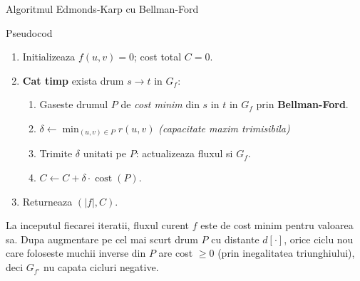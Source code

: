 ﻿\documentclass[9pt]{beamer}
\newcommand{\cost}{\operatorname{cost}}
\begin{document}
\begin{frame}[shrink]{Algoritmul Edmonds-Karp cu Bellman-Ford}
  \begin{block}{Pseudocod}
    \begin{enumerate}
      \item Initializeaza $f(u,v)=0$; cost total $C=0$.
      \item \textbf{Cat timp} exista drum $s\to t$ in $G_f$:
        \begin{enumerate}
          \item Gaseste drumul $P$ de \textit{cost minim} din $s$ in $t$ in $G_f$
                prin \textbf{Bellman-Ford}.
          \item $\delta\leftarrow\min_{(u,v)\in P} r(u,v)$ \quad \textit{(capacitate maxim trimisibila)}
          \item Trimite $\delta$ unitati pe $P$: actualizeaza fluxul si $G_f$.
          \item $C\leftarrow C+\delta\cdot\cost(P)$.
        \end{enumerate}
      \item Returneaza $(|f|, C)$.
    \end{enumerate}
  \end{block}
  \begin{theorem}
    La inceputul fiecarei iteratii, fluxul curent $f$ este de cost minim pentru valoarea sa.
    Dupa augmentare pe cel mai scurt drum $P$ cu distante $d[\cdot]$, orice ciclu nou
    care foloseste muchii inverse din $P$ are cost $\geq 0$ (prin inegalitatea triunghiului),
    deci $G_{f'}$ nu capata cicluri negative.
  \end{theorem}
\end{frame}
\end{document}
